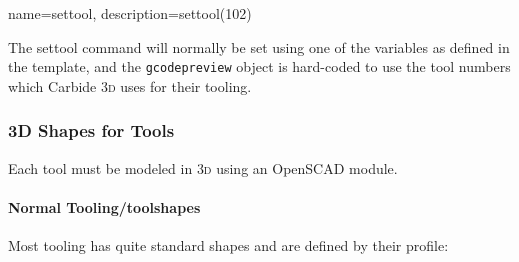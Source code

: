 \documentclass{ltxdoc}
\begin{document}
{
    name=settool, 
    description={settool(102)}
}

The \gls{settool} command will normally be set using one of the variables as defined in the template, and the \verb|gcodepreview| object is hard-coded to use the tool numbers which Carbide \textsc{3d} uses for their tooling.

\subsubsection{3D Shapes for Tools}

Each tool must be modeled in \textsc{3d} using an OpenSCAD module. 

\begin{samepage}
\paragraph{Normal Tooling/toolshapes}

\label{para:normaltooling} Most tooling has quite standard shapes 
and are defined by their profile:


\end{samepage}
\end{document}
